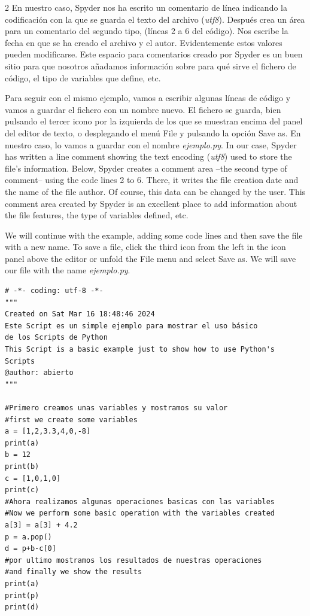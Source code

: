 \begin{paracol}{2}
En nuestro caso, Spyder nos ha escrito un comentario de línea indicando la codificación con la que se guarda el texto del archivo (\emph{utf8}). Después crea un área para un comentario del segundo tipo, (líneas 2  a 6 del código). Nos escribe la fecha en que se ha creado el archivo y el autor. Evidentemente estos valores pueden modificarse. Este espacio para comentarios creado por Spyder es un buen sitio para que nosotros añadamos información sobre para qué sirve el fichero de código, el tipo de variables que define, etc.

Para seguir con el mismo ejemplo, vamos a escribir algunas líneas de código y vamos a guardar el fichero con un nombre nuevo. El fichero se guarda, bien pulsando el tercer icono por la izquierda de los que se muestran encima del panel del editor de texto, o desplegando el menú File y pulsando la opción Save as. En nuestro caso, lo vamos a guardar con el nombre \emph{ejemplo.py}.
\switchcolumn
In our case, Spyder has written a line comment showing the text encoding (\emph{utf8}) used to store the file's information. Below, Spyder creates a comment area --the second type of comment-- using the code lines 2 to 6. There, it writes the file creation date and the name of the file author. Of course, this data can be changed by the user. This comment area created by Spyder is an excellent place to add information about the file features, the type of variables defined, etc.

We will continue with the example, adding some code lines and then save the file with a new name. To save a file, click the third icon from the left in the icon panel above the editor or unfold the File menu and select Save as. We will save our file with the name \emph{ejemplo.py}.
\end{paracol}

\begin{verbatim}
# -*- coding: utf-8 -*-
"""
Created on Sat Mar 16 18:48:46 2024
Este Script es un simple ejemplo para mostrar el uso básico
de los Scripts de Python
This Script is a basic example just to show how to use Python's
Scripts
@author: abierto 
"""

#Primero creamos unas variables y mostramos su valor
#first we create some variables
a = [1,2,3.3,4,0,-8]
print(a)
b = 12
print(b)
c = [1,0,1,0]
print(c)
#Ahora realizamos algunas operaciones basicas con las variables
#Now we perform some basic operation with the variables created
a[3] = a[3] + 4.2
p = a.pop()
d = p+b-c[0]
#por ultimo mostramos los resultados de nuestras operaciones
#and finally we show the results 
print(a)
print(p)
print(d)
\end{verbatim}

